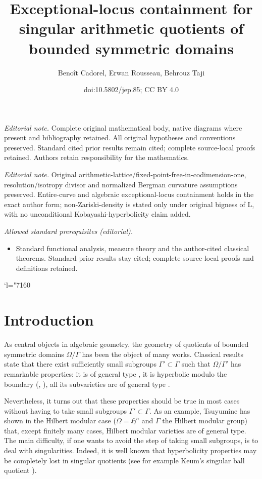 \documentclass[10pt]{amsart}
\title{Exceptional-locus containment for singular arithmetic quotients of bounded symmetric domains}
\author{Benoît Cadorel, Erwan Rousseau, Behrouz Taji}
\date{doi:10.5802/jep.85; CC BY 4.0}
\newcommand{\Changel}{\mathcode`l="7160}
\theoremstyle{plain}
\theoremstyle{definition}
\numberwithin{equation}{theorem}
\newcommand\HH{\mathfrak H}
\providecommand{\mainmatter}{}\providecommand{\backmatter}{}
\begin{document}
\maketitle
\noindent\textit{Editorial note.} Complete original mathematical body, native diagrams where present and bibliography retained. All original hypotheses and conventions preserved. Standard cited prior results remain cited; complete source-local proofs retained. Authors retain responsibility for the mathematics.\par\medskip
\noindent\textit{Editorial note.} Original arithmetic-lattice/fixed-point-free-in-codimension-one, resolution/isotropy divisor and normalized Bergman curvature assumptions preserved. Entire-curve and algebraic exceptional-locus containment holds in the exact author form; non-Zariski-density is stated only under original bigness of L, with no unconditional Kobayashi-hyperbolicity claim added.\par\medskip
\noindent\textit{Allowed standard prerequisites (editorial).}\begin{itemize}
\item Standard functional analysis, measure theory and the author-cited classical theorems. Standard prior results stay cited; complete source-local proofs and definitions retained.
\end{itemize}\medskip
\vspace*{-\baselineskip}
\tableofcontents
\mainmatter
\bgroup
\Changel

\section{Introduction}
As central objects in algebraic geometry, the geometry of quotients of bounded symmetric domains $\Omega/\Gamma$ has been the object of many works. Classical results state that there exist sufficiently small subgroups $\Gamma' \subset \Gamma$ such that $\Omega/\Gamma'$ has remarkable properties: it is of general type \cite{Mum77}, it is hyperbolic modulo the boundary (\cite{Na89}, \cite{Rou16}), all its subvarieties are of general type \cite{Bru}.

Nevertheless, it turns out that these properties should be true in most cases without having to take small subgroups $\Gamma' \subset \Gamma$. As an example, Tsuyumine \cite{Tsu85} has shown in the Hilbert modular case ($\Omega=\HH^n$ and $\Gamma$ the Hilbert modular group) that, except finitely many cases, Hilbert modular varieties are of general type. The main difficulty, if one wants to avoid the step of taking small subgroups, is to deal with singularities. Indeed, it is well known that hyperbolicity properties may be completely lost in singular quotients (see for example Keum's singular ball quotient \cite{Keum08}).
\end{document}
